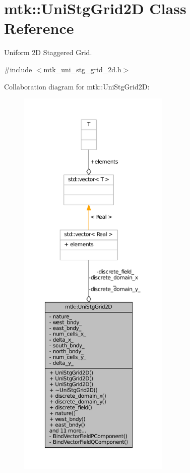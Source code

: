 \hypertarget{classmtk_1_1UniStgGrid2D}{\section{mtk\+:\+:Uni\+Stg\+Grid2\+D Class Reference}
\label{classmtk_1_1UniStgGrid2D}
}


Uniform 2\+D Staggered Grid.  




{\ttfamily \#include $<$mtk\+\_\+uni\+\_\+stg\+\_\+grid\+\_\+2d.\+h$>$}



Collaboration diagram for mtk\+:\+:Uni\+Stg\+Grid2\+D\+:
\nopagebreak
\begin{figure}[H]
\begin{center}
\leavevmode
\includegraphics[height=550pt]{classmtk_1_1UniStgGrid2D__coll__graph}
\end{center}
\end{figure}
